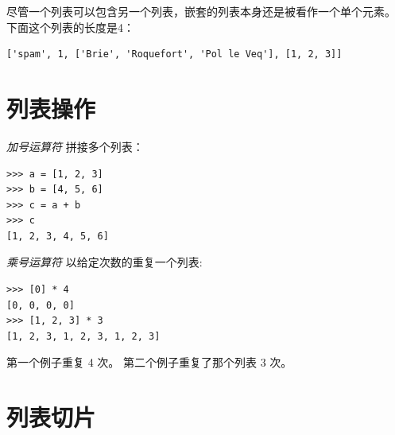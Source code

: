 尽管一个列表可以包含另一个列表，嵌套的列表本身还是被看作一个单个元素。
下面这个列表的长度是4：
  

\begin{lstlisting}
['spam', 1, ['Brie', 'Roquefort', 'Pol le Veq'], [1, 2, 3]]
\end{lstlisting}


\section{列表操作}


{\em 加号运算符}\li{+} 拼接多个列表：

  

\begin{lstlisting}
>>> a = [1, 2, 3]
>>> b = [4, 5, 6]
>>> c = a + b
>>> c
[1, 2, 3, 4, 5, 6]
\end{lstlisting}

%

{\em 乘号运算符} \li{*} 以给定次数的重复一个列表:
  

\begin{lstlisting}
>>> [0] * 4
[0, 0, 0, 0]
>>> [1, 2, 3] * 3
[1, 2, 3, 1, 2, 3, 1, 2, 3]
\end{lstlisting}

%

第一个例子重复 4 次。 第二个例子重复了那个列表 3 次。

\section{列表切片}
    
  


